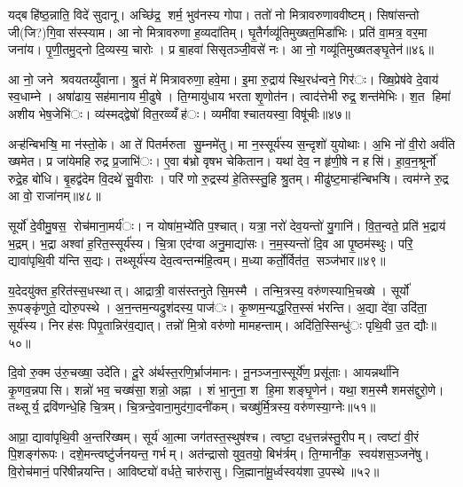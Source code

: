 यद्बहि॑ष्ठ॒न्नाति॒ विदे॑ सुदानू। अच्छि॑द्र॒ शर्म॒ भुव॑नस्य गोपा। ततो॑ नो मित्रावरुणाववीष्टम्। सिषा॑सन्तो जी(जि?)गि॒वास॑स्स्याम। आ नो मित्रावरुणा ह॒व्यदा॑तिम्। घृ॒तैर्गव्यू॑तिमुख्षत॒मिडा॑भिः। प्रति॑ वा॒मत्र॒ वर॒मा जना॑य। पृ॒णी॒तमु॒द्नो दि॒व्यस्य॒ चारोः। प्र बा॒हवा॑ सिसृतञ्जी॒वसे॑ नः। आ नो॒ गव्यू॑तिमुख्षतङ्घृ॒तेन॑॥४६॥

आ नो॒ जने श्रवयतय्युँवाना। श्रु॒तं मे॑ मित्रावरुणा॒ हवे॒मा। इ॒मा रु॒द्राय॑ स्थि॒रध॑न्वने॒ गिर॑ः। ख्षि॒प्रेष॑वे दे॒वाय॑ स्व॒धाम्ने। अषा॑ढाय॒ सह॑मानाय मी॒ढुषे। ति॒ग्मायु॑धाय भरता शृ॒णोत॑न। त्वाद॑त्तेभी रुद्र॒ शन्त॑मेभिः। श॒त हिमा॑ अशीय भेष॒जेभि॑ः। व्य॑स्मद्द्वेषो॑ वित॒रव्व्यँह॑ः। व्यमी॑वाश्चातयस्वा॒ विषू॑चीः॥४७॥

अऱ्ह॑न्बिभऱ्षि॒ मा न॑स्तो॒के। आ ते॑ पितर्मरुता सु॒म्नमे॑तु। मा न॒स्सूर्य॑स्य स॒न्दृशो॑ युयोथाः। अ॒भि नो॑ वी॒रो अर्व॑ति ख्षमेत। प्र जा॑येमहि रुद्र प्र॒जाभि॑ः। ए॒वा ब॑भ्रो वृषभ चेकितान। यथा॑ देव॒ न हृ॑णी॒षे न हसि॑। हा॒व॒न॒श्रूर्नो॑ रुद्रे॒ह बो॑धि। बृ॒हद्व॑देम वि॒दथे॑ सु॒वीराः। परि॑ णो रु॒द्रस्य॑ हे॒तिस्स्तु॒हि श्रु॒तम्। मीढु॑ष्ट॒माऱ्ह॑न्बिभऱ्षि। त्वम॑ग्ने रु॒द्र आ वो॒ राजा॑नम्॥४८॥


सूर्यो॑ दे॒वीमु॒षस॒ रोच॑माना॒मर्य॑ः। न योषा॑म॒भ्ये॑ति प॒श्चात्। यत्रा॒ नरो॑ देव॒यन्तो॑ यु॒गानि॑। वि॒त॒न्वते॒ प्रति॑ भ॒द्राय॑ भ॒द्रम्। भ॒द्रा अश्वा॑ ह॒रित॒स्सूर्य॑स्य। चि॒त्रा एद॑ग्वा अनु॒माद्या॑सः। न॒म॒स्यन्तो॑ दि॒व आ पृ॒ष्ठम॑स्थुः। परि॒ द्यावा॑पृथि॒वी य॑न्ति स॒द्यः। तथ्सूर्य॑स्य देव॒त्वन्तन्म॑हि॒त्वम्। म॒ध्या कर्तो॒र्वित॑त॒ सञ्ज॑भार॥४९॥

य॒देदयु॑क्त ह॒रित॑स्स॒धस्थात्। आद्रात्री॒ वास॑स्तनुते सि॒मस्मै। तन्मि॒त्रस्य॒ वरु॑णस्याभि॒चख्षे। सूर्यो॑ रू॒पङ्कृ॑णुते॒ द्योरु॒पस्थे। अ॒न॒न्तम॒न्यद्रुश॑दस्य॒ पाज॑ः। कृ॒ष्णम॒न्यद्ध॒रित॒स्सं भ॑रन्ति। अ॒द्या दे॑वा॒ उदि॑ता॒ सूर्य॑स्य। निरह॑सः पिपृ॒तान्निर॑व॒द्यात्। तन्नो॑ मि॒त्रो वरु॑णो मामहन्ताम्। अदि॑ति॒स्सिन्धु॑ः पृथि॒वी उ॒त द्यौः॥५०॥

दि॒वो रु॒क्म उ॑रु॒चख्षा॒ उदे॑ति। दू॒रे अ॑र्थस्त॒रणि॒र्भ्राज॑मानः। नू॒नञ्जना॒स्सूर्ये॑ण॒ प्रसू॑ताः। आयन्नर्था॑नि कृ॒णव॒न्नपासि। शन्नो॑ भव॒ चख्ष॑सा॒ शन्नो॒ अह्ना। शं भा॒नुना॒ श हि॒मा शङ्घृ॒णेन॑। यथा॒ शम॒स्मै शमस॑द्दुरो॒णे। तथ्सूर्य॒ द्रवि॑णन्धे॒हि चि॒त्रम्। चि॒त्रन्दे॒वाना॒मुद॑गा॒दनी॑कम्। चख्षु॑र्मि॒त्रस्य॒ वरु॑णस्या॒ग्नेः॥५१॥

आप्रा॒ द्यावा॑पृथि॒वी अ॒न्तरि॑ख्षम्। सूर्य॑ आ॒त्मा जग॑तस्त॒स्थुष॑श्च। त्वष्टा॒ दध॒त्तन्न॑स्तु॒रीपम्। त्वष्टा॑ वी॒रं पि॒शङ्ग॑रूपः। दशे॒मन्त्वष्टु॑र्जनयन्त॒ गर्भम्। अत॑न्द्रासो युव॒तयो॒ बिभ॑र्त्रम्। ति॒ग्मानी॑क॒ स्वय॑शस॒ञ्जने॑षु। वि॒रोच॑मानं॒ परि॑षीन्नयन्ति। आविष्ट्यो॑ वर्धते॒ चारु॑रासु। जि॒ह्माना॑मू॒र्ध्वस्वय॑शा उ॒पस्थे॥५२॥

